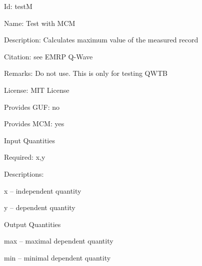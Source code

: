 \begin{tightdesc}
\item [Id:] testM
\item [Name:] Test with MCM
\item [Description:] Calculates maximum value of the measured record
\item [Citation:] see EMRP Q-Wave
\item [Remarks:] Do not use. This is only for testing QWTB
\item [License:] MIT License
\item [Provides GUF:] no
\item [Provides MCM:] yes
\item [Input Quantities] \rule{0em}{0em}
    \begin{tightdesc}
    \item [Required:] 
        \textsf{x},\enspace \textsf{y}
    \end{tightdesc}
\item [Descriptions:] \rule{0em}{0em}
    \begin{tightdesc}
        \item[\textsf{x}] -- independent quantity
        \item[\textsf{y}] -- dependent quantity
    \end{tightdesc}
\item [Output Quantities] \rule{0em}{0em}
    \begin{tightdesc}
        \item[\textsf{max}] -- maximal dependent quantity
        \item[\textsf{min}] -- minimal dependent quantity
    \end{tightdesc}
\end{tightdesc}
